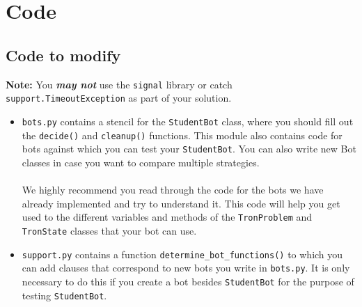 \documentclass{article}
\begin{document}
\section{Code}
    \subsection{Code to modify}
    \begin{adjustwidth}{25pt}{0pt}\textbf{Note:} You \textit{\textbf{may not}} use the \texttt{signal} library or catch \\ \texttt{support.TimeoutException} as part of your solution.
    \end{adjustwidth}
    \begin{itemize}
        \item \texttt{bots.py} contains a stencil for the \texttt{StudentBot} class, where you should fill out the \texttt{decide()} and \texttt{cleanup()} functions.
        This module also contains code for bots against which you can test your \texttt{StudentBot}. You can also write new Bot classes in case you want to compare multiple strategies.
        \\ \\
        We highly recommend you read through the code for the bots we have already implemented and try to understand it. This code will help you get used to the different variables and methods of the \texttt{TronProblem} and \texttt{TronState} classes that your bot can use.

        \item \texttt{support.py} contains a function \texttt{determine\_bot\_functions()} to which you can add clauses that correspond to new bots you write in \texttt{bots.py}.
        It is only necessary to do this if you create a bot besides \texttt{StudentBot} for the purpose of testing \texttt{StudentBot}.
    \end{itemize}
\end{document}
